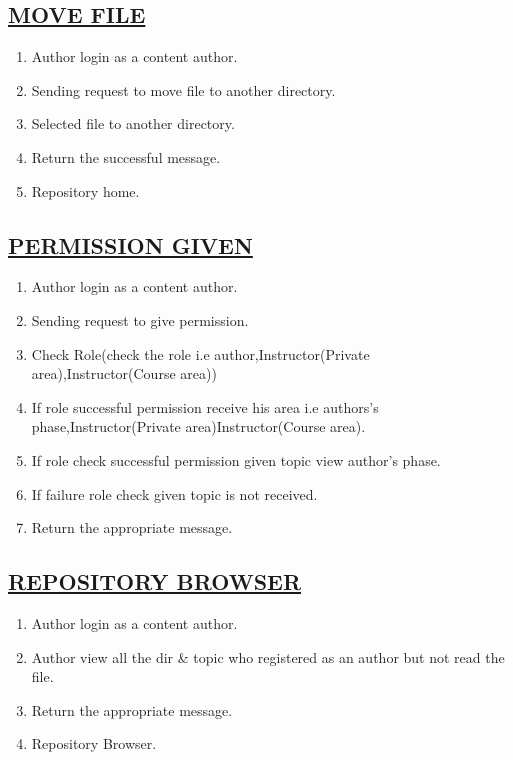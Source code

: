 \documentclass{article}
\begin{document}
\subsection*{\underline{MOVE FILE}}
\begin{enumerate}
                                \item Author login as a content author.
                                   \item Sending request to move file to another directory.
                                     \item Selected file to another directory.
                                       \item Return the successful message.
                                         \item Repository home.
\begin{center}

\label{figure:move_rep.latex}
\end{center}
\end{enumerate}
\subsection*{\underline{PERMISSION GIVEN}}
\begin{enumerate}
                       \item Author login as a content author.
                          \item Sending request to give permission.
                            \item Check Role(check the role i.e author,Instructor(Private area),Instructor(Course area))
      \item If role successful permission receive his area i.e authors's phase,Instructor(Private area)Instructor(Course area). 
                              \item If role check successful permission given topic view author's phase.
                                \item If failure role check given topic is not received.
                                  \item Return the appropriate message.
\begin{center}

\label{figure:permission_rep.latex}
\end{center}
\end{enumerate}
\subsection*{\underline{REPOSITORY BROWSER}}
\begin{enumerate}
\item Author login as a content author.
\item Author view all the dir \& topic who registered as an author but not read the file.
\item Return the appropriate message.
\item Repository Browser.
\begin{center}

\label{figure:repositoryBro_rep.latex}
\end{center}
\end{enumerate}
\end{document}
